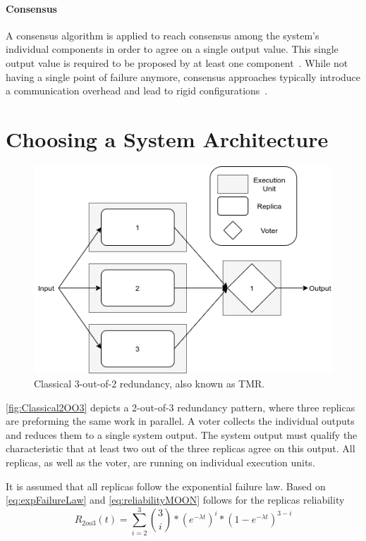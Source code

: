 \paragraph{Consensus} 
A consensus algorithm is applied to reach consensus among the system's individual components in order to agree on a single output value.
This single output value is required to be proposed by at least one component~\cite{lamport2001paxos}.
While not having a single point of failure anymore, consensus approaches typically introduce a communication overhead and lead to rigid configurations~\cite{GamerIncreasingMOON}.


\section{Choosing a System Architecture}

\begin{figure}[!hb]
	\centering
	\includegraphics[width=0.75\linewidth]{images/Classical2OO3}
	\caption{Classical 3-out-of-2 redundancy, also known as \Gls*{TMR}.}
	\label{fig:Classical2OO3}
\end{figure}

\autoref{fig:Classical2OO3} depicts a 2-out-of-3 redundancy pattern, where three replicas are preforming the same work in parallel.
A voter collects the individual outputs and reduces them to a single system output.
The system output must qualify the characteristic that at least two out of the three replicas agree on this output.
All replicas, as well as the voter, are running on individual execution units.

It is assumed that all replicas follow the exponential failure law.
Based on \autoref{eq:expFailureLaw} and \autoref{eq:reliabilityMOON} follows for the replicas reliability
\begin{equation}
R_{2oo3}(t) = \sum_{i = 2}^3 {3 \choose i} * (e^{-\lambda t})^i * (1 - e^{-\lambda t})^{3 - i}
\end{equation}

